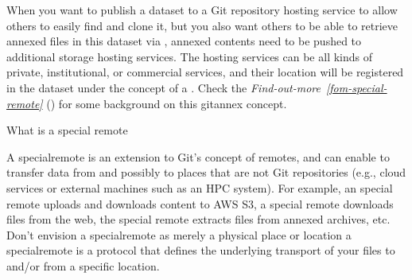 \sphinxAtStartPar
When you want to publish a dataset to a Git repository hosting service to allow others to easily find and clone it, but you also want others to be able to retrieve annexed files in this dataset via , annexed contents need to be pushed to additional storage hosting services.
The hosting services can be all kinds of private, institutional, or commercial services, and their location will be registered in the dataset under the concept of a {\hyperref[\detokenize{glossary:term-special-remote}]{}}. Check the \textit{Find-out-more}~{\findoutmoreiconinline}\textit{\ref{fom-special-remote}} {\hyperref[\detokenize{basics/101-138-sharethirdparty:fom-special-remote}]{}} () for some background on this git\sphinxhyphen{}annex concept.

\ignorespaces \begin{findoutmore}[label={fom-special-remote}, before title={\thetcbcounter\ }, float, floatplacement=tb, check odd page=true]{What is a special remote}
\label{\detokenize{basics/101-138-sharethirdparty:fom-special-remote}}

\sphinxAtStartPar
A special\sphinxhyphen{}remote is an extension to Git’s concept of remotes, and can
enable {\hyperref[\detokenize{glossary:term-git-annex}]{}} to transfer data from and possibly to places that are not Git
repositories (e.g., cloud services or external machines such as an HPC
system). For example, an  special remote uploads and downloads content
to AWS S3, a  special remote downloads files from the web, the  special remote
extracts files from annexed archives, etc. Don’t envision a special\sphinxhyphen{}remote
as merely a physical place or location \textendash{} a special\sphinxhyphen{}remote is a protocol that
defines the underlying transport of your files to and/or from a specific location.


\end{findoutmore}

